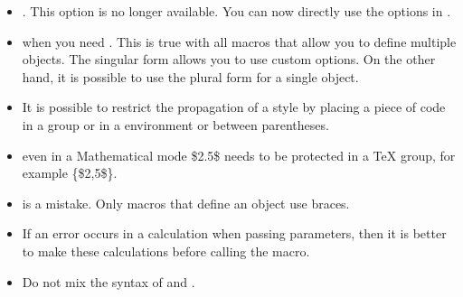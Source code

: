 \begin{itemize}\setlength{\itemsep}{10pt}

\item {}. This option is no longer
available. You can now directly use the options in \TIKZ.

\item {} when you need . This is
true with all macros that allow you to define multiple objects. The singular
form allows you to use custom options. On the other hand, it is possible to use
the plural form for a single object.

\item {} It is possible to restrict the
propagation of a style by placing a piece of code in a group or in a
 environment or between parentheses.

\item {} even in a Mathematical mode \$2.5\$ needs
to be protected in a TeX group, for example \{\$2,5\$\}.

\item {} is a mistake. Only macros that
define an object use braces.

\item If an error occurs in a calculation when passing parameters, then it is
better to make these calculations before calling the macro.

\item Do not mix the syntax of  and .

\end{itemize}

\endinput
